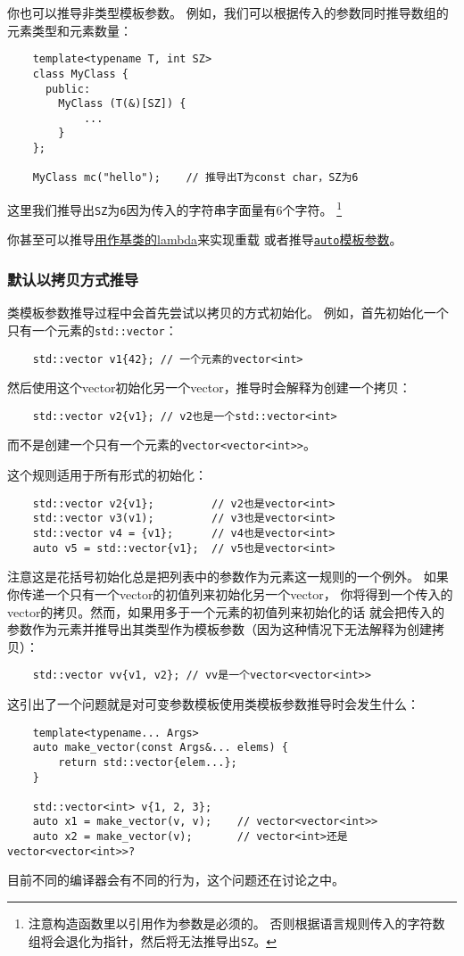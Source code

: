 你也可以推导非类型模板参数。
例如，我们可以根据传入的参数同时推导数组的元素类型和元素数量：
\begin{lstlisting}
    template<typename T, int SZ>
    class MyClass {
      public:
        MyClass (T(&)[SZ]) {
            ...
        }
    };

    MyClass mc("hello");    // 推导出T为const char，SZ为6
\end{lstlisting}
这里我们推导出\texttt{SZ}为\texttt{6}因为传入的字符串字面量有6个字符。
\footnote{注意构造函数里以引用作为参数是必须的。
否则根据语言规则传入的字符数组将会退化为指针，然后将无法推导出\texttt{SZ}。}

你甚至可以推导\hyperref[ch14.1]{用作基类的lambda}来实现重载
或者推导\hyperref[ch13.1]{\texttt{auto}模板参数}。

\subsubsection{默认以拷贝方式推导}\label{ch9.1.1}
类模板参数推导过程中会首先尝试以拷贝的方式初始化。
例如，首先初始化一个只有一个元素的\texttt{std::vector}：
\begin{lstlisting}
    std::vector v1{42}; // 一个元素的vector<int>
\end{lstlisting}
然后使用这个vector初始化另一个vector，推导时会解释为创建一个拷贝：
\begin{lstlisting}
    std::vector v2{v1}; // v2也是一个std::vector<int>
\end{lstlisting}
而不是创建一个只有一个元素的\texttt{vector<vector<int>>}。

这个规则适用于所有形式的初始化：
\begin{lstlisting}
    std::vector v2{v1};         // v2也是vector<int>
    std::vector v3(v1);         // v3也是vector<int>
    std::vector v4 = {v1};      // v4也是vector<int>
    auto v5 = std::vector{v1};  // v5也是vector<int>
\end{lstlisting}
注意这是花括号初始化总是把列表中的参数作为元素这一规则的一个例外。
如果你传递一个只有一个vector的初值列来初始化另一个vector，
你将得到一个传入的vector的拷贝。然而，如果用多于一个元素的初值列来初始化的话
就会把传入的参数作为元素并推导出其类型作为模板参数（因为这种情况下无法解释为创建拷贝）：
\begin{lstlisting}
    std::vector vv{v1, v2}; // vv是一个vector<vector<int>>
\end{lstlisting}
这引出了一个问题就是对可变参数模板使用类模板参数推导时会发生什么：
\begin{lstlisting}
    template<typename... Args>
    auto make_vector(const Args&... elems) {
        return std::vector{elem...};
    }

    std::vector<int> v{1, 2, 3};
    auto x1 = make_vector(v, v);    // vector<vector<int>>
    auto x2 = make_vector(v);       // vector<int>还是vector<vector<int>>?
\end{lstlisting}
目前不同的编译器会有不同的行为，这个问题还在讨论之中。

